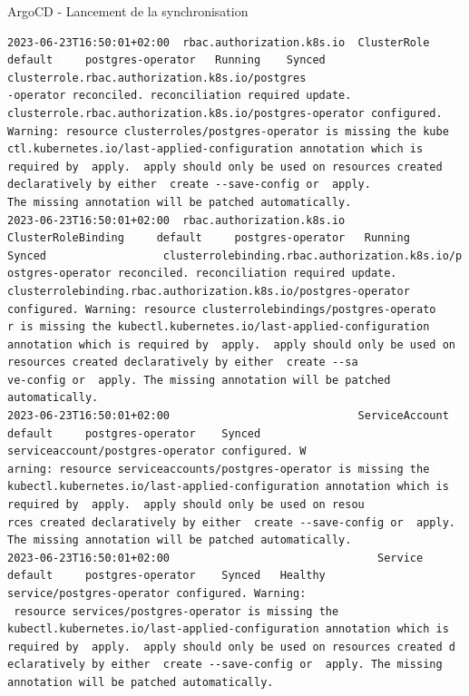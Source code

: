 \begin{frame}[fragile,shrink=1]{ArgoCD - Lancement de la synchronisation}
\begin{tiny}
\begin{Verbatim}[commandchars=\\\{\}]
2023-06-23T16:50:01+02:00  rbac.authorization.k8s.io  ClusterRole            default     postgres-operator   Running    Synced                  clusterrole.rbac.authorization.k8s.io/postgres
-operator reconciled. reconciliation required update. clusterrole.rbac.authorization.k8s.io/postgres-operator configured. Warning: resource clusterroles/postgres-operator is missing the kube
ctl.kubernetes.io/last-applied-configuration annotation which is required by  apply.  apply should only be used on resources created declaratively by either  create --save-config or  apply. 
The missing annotation will be patched automatically.                                                                                                                                         
2023-06-23T16:50:01+02:00  rbac.authorization.k8s.io  ClusterRoleBinding     default     postgres-operator   Running    Synced                  clusterrolebinding.rbac.authorization.k8s.io/p
ostgres-operator reconciled. reconciliation required update. clusterrolebinding.rbac.authorization.k8s.io/postgres-operator configured. Warning: resource clusterrolebindings/postgres-operato
r is missing the kubectl.kubernetes.io/last-applied-configuration annotation which is required by  apply.  apply should only be used on resources created declaratively by either  create --sa
ve-config or  apply. The missing annotation will be patched automatically.                                                                                                                    
2023-06-23T16:50:01+02:00                             ServiceAccount         default     postgres-operator    Synced                            serviceaccount/postgres-operator configured. W
arning: resource serviceaccounts/postgres-operator is missing the kubectl.kubernetes.io/last-applied-configuration annotation which is required by  apply.  apply should only be used on resou
rces created declaratively by either  create --save-config or  apply. The missing annotation will be patched automatically.                                                                   
2023-06-23T16:50:01+02:00                                Service             default     postgres-operator    Synced   Healthy                  service/postgres-operator configured. Warning:
 resource services/postgres-operator is missing the kubectl.kubernetes.io/last-applied-configuration annotation which is required by  apply.  apply should only be used on resources created d
eclaratively by either  create --save-config or  apply. The missing annotation will be patched automatically.                                                                                 

\end{Verbatim}
\end{tiny}
\end{frame}
